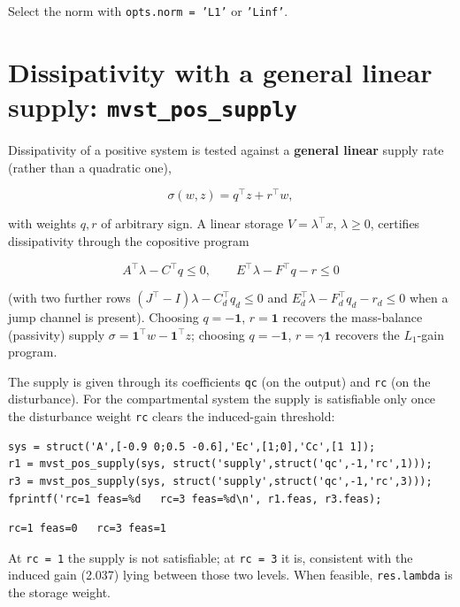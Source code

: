 \documentclass[11pt,oneside]{report}
\newcommand{\code}[1]{\texttt{#1}}
\begin{document}
Select the norm with \code{opts.norm = 'L1'} or \code{'Linf'}.

\hypertarget{dissipativity-with-a-general-linear-supply-mvst_pos_supply}{%
\section{\texorpdfstring{Dissipativity with a general linear supply: \code{mvst\_pos\_supply}}{Dissipativity with a general linear supply: mvst\_pos\_supply}}\label{dissipativity-with-a-general-linear-supply-mvst_pos_supply}}

Dissipativity of a positive system is tested against a \textbf{general linear} supply
rate (rather than a quadratic one),

\[
\sigma(w,z) = q^\top z + r^\top w,
\]

with weights \(q, r\) of arbitrary sign. A linear storage \(V = \lambda^\top x\),
\(\lambda \ge 0\), certifies dissipativity through the copositive program

\[
A^\top \lambda - C^\top q \le 0,
\qquad
E^\top \lambda - F^\top q - r \le 0
\]

(with two further rows \((J^\top - I)\lambda - C_d^\top q_d \le 0\) and
\(E_d^\top \lambda - F_d^\top q_d - r_d \le 0\) when a jump channel is present).
Choosing \(q = -\mathbf 1\), \(r = \mathbf 1\) recovers the mass-balance
(passivity) supply \(\sigma = \mathbf 1^\top w - \mathbf 1^\top z\); choosing
\(q = -\mathbf 1\), \(r = \gamma \mathbf 1\) recovers the \(L_1\)-gain program.

The supply is given through its coefficients \code{qc} (on the output) and \code{rc} (on
the disturbance). For the compartmental system the supply is satisfiable only
once the disturbance weight \code{rc} clears the induced-gain threshold:

\begin{lstlisting}[style=matlabstyle]
sys = struct('A',[-0.9 0;0.5 -0.6],'Ec',[1;0],'Cc',[1 1]);
r1 = mvst_pos_supply(sys, struct('supply',struct('qc',-1,'rc',1)));
r3 = mvst_pos_supply(sys, struct('supply',struct('qc',-1,'rc',3)));
fprintf('rc=1 feas=%d   rc=3 feas=%d\n', r1.feas, r3.feas);
\end{lstlisting}

\begin{lstlisting}[style=outputstyle]
rc=1 feas=0   rc=3 feas=1
\end{lstlisting}

At \code{rc = 1} the supply is not satisfiable; at \code{rc = 3} it is, consistent with the
induced gain (2.037) lying between those two levels. When feasible, \code{res.lambda}
is the storage weight.
\end{document}
